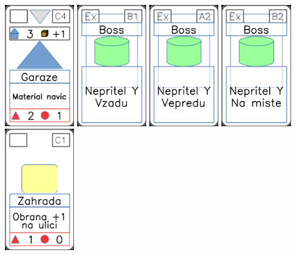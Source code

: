 \documentclass[a4paper]{article}
\begin{document}
	\includegraphics[width=3.0cm]{img-3_13}
	\includegraphics[width=3.0cm]{img-4_5}
	\includegraphics[width=3.0cm]{img-4_1}
	\includegraphics[width=3.0cm]{img-4_6}
	\includegraphics[width=3.0cm]{img-3_25}
\end{document}
